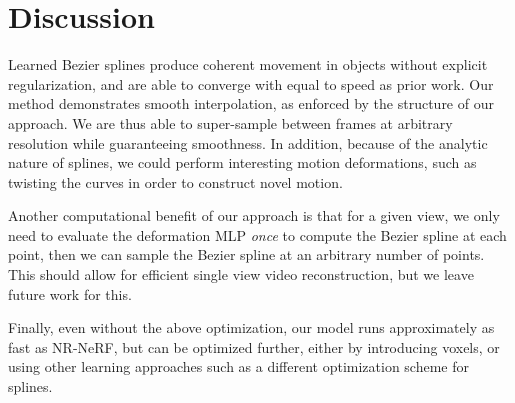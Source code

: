 \section*{Discussion}

Learned Bezier splines produce coherent movement in objects without explicit regularization, and are able to converge with equal to speed as prior work. Our method demonstrates smooth interpolation, as enforced by the structure of our approach. We are thus able to super-sample between frames at arbitrary resolution while guaranteeing smoothness. In addition, because of the analytic nature of splines, we could perform interesting motion deformations, such as twisting the curves in order to construct novel motion.

Another computational benefit of our approach is that for a given view, we only need to evaluate the deformation MLP \textit{once} to compute the Bezier spline at each point, then we can sample the Bezier spline at an arbitrary number of points. This should allow for efficient single view video reconstruction, but we leave future work for this.

Finally, even without the above optimization, our model runs approximately as fast as NR-NeRF, but can be optimized further, either by introducing voxels, or using other learning approaches such as a different optimization scheme for splines.